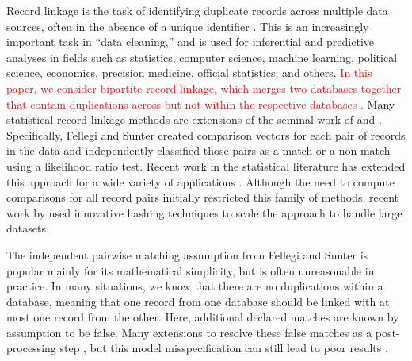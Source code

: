 \documentclass[12pt,letterpaper]{article}
\newcommand{\1}[1]{\mathbb{I}\!\left[#1\right]} %
\begin{document}
	
	Record linkage is the task of identifying duplicate records across multiple data sources, often in the absence of a unique identifier \citep{christen_2012}. This is an increasingly important task in ``data cleaning,'' and is used for inferential and predictive analyses in fields such as statistics, computer science, machine learning, political science, economics, precision medicine, official statistics, and others. \textcolor{red}{In this paper, we consider bipartite record linkage, which merges two databases together that contain duplications across but not within the respective databases \citep{fellegi_theory_1969, jaro1989, Winkler1988, belin_1995, larsen_2001, liseo_2011,  herzog2007data, gutman_bayesian_2013, sadinle_bayesian_2017}.}
	Many statistical record linkage methods are extensions of the seminal work of \cite{fellegi_theory_1969} and \cite{newcombe_automatic_1959}. Specifically, Fellegi and Sunter created comparison vectors for each pair of records in the data and independently classified those pairs as a match or a non-match using a likelihood ratio test. Recent work in the statistical literature has extended this approach for a wide variety of applications \citep{winkler1991application, fair2004generalized, wagner2014person, gill2003english}. Although the need to compute comparisons for all record pairs initially restricted this family of methods, recent work by \cite{enamorado2019using} used innovative hashing techniques to scale the approach to handle large datasets.
	
	The independent pairwise matching assumption from Fellegi and Sunter is popular mainly for its mathematical simplicity, but is often unreasonable in practice. In many situations, we know that there are no duplications within a database, meaning that one record from one database should be linked with at most one record from the other. Here, additional declared matches are known by assumption to be false. Many extensions to \cite{fellegi_theory_1969} resolve these false matches as a post-processing step \citep{jaro1989}, but this model misspecification can still lead to poor results \citep{sadinle_bayesian_2017}.
	
\end{document}
